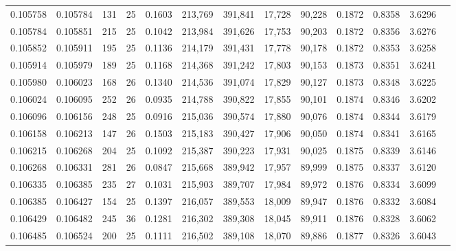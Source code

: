 \begin{tabular}{rrrrrrrrrrrrr}
0.105758 & 0.105784 & 131 &  25 &                                     0.1603 & 213,769 & 391,841 &  17,728 &  90,228 & 0.1872 & 0.8358 & 3.6296 \\
0.105784 & 0.105851 & 215 &  25 &                                     0.1042 & 213,984 & 391,626 &  17,753 &  90,203 & 0.1872 & 0.8356 & 3.6276 \\
0.105852 & 0.105911 & 195 &  25 &                                     0.1136 & 214,179 & 391,431 &  17,778 &  90,178 & 0.1872 & 0.8353 & 3.6258 \\
0.105914 & 0.105979 & 189 &  25 &                                     0.1168 & 214,368 & 391,242 &  17,803 &  90,153 & 0.1873 & 0.8351 & 3.6241 \\
0.105980 & 0.106023 & 168 &  26 &                                     0.1340 & 214,536 & 391,074 &  17,829 &  90,127 & 0.1873 & 0.8348 & 3.6225 \\
0.106024 & 0.106095 & 252 &  26 &                                     0.0935 & 214,788 & 390,822 &  17,855 &  90,101 & 0.1874 & 0.8346 & 3.6202 \\
0.106096 & 0.106156 & 248 &  25 &                                     0.0916 & 215,036 & 390,574 &  17,880 &  90,076 & 0.1874 & 0.8344 & 3.6179 \\
0.106158 & 0.106213 & 147 &  26 &                                     0.1503 & 215,183 & 390,427 &  17,906 &  90,050 & 0.1874 & 0.8341 & 3.6165 \\
0.106215 & 0.106268 & 204 &  25 &                                     0.1092 & 215,387 & 390,223 &  17,931 &  90,025 & 0.1875 & 0.8339 & 3.6146 \\
0.106268 & 0.106331 & 281 &  26 &                                     0.0847 & 215,668 & 389,942 &  17,957 &  89,999 & 0.1875 & 0.8337 & 3.6120 \\
0.106335 & 0.106385 & 235 &  27 &                                     0.1031 & 215,903 & 389,707 &  17,984 &  89,972 & 0.1876 & 0.8334 & 3.6099 \\
0.106385 & 0.106427 & 154 &  25 &                                     0.1397 & 216,057 & 389,553 &  18,009 &  89,947 & 0.1876 & 0.8332 & 3.6084 \\
0.106429 & 0.106482 & 245 &  36 &                                     0.1281 & 216,302 & 389,308 &  18,045 &  89,911 & 0.1876 & 0.8328 & 3.6062 \\
0.106485 & 0.106524 & 200 &  25 &                                     0.1111 & 216,502 & 389,108 &  18,070 &  89,886 & 0.1877 & 0.8326 & 3.6043 \\

\end{tabular}
